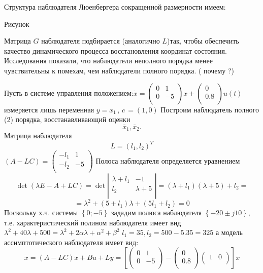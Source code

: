 \documentclass[preprint,russian,a5paper,10pt,twoside,mediummath]{ncc}
\begin{document}
Структура наблюдателя Люенбергера сокращенной размерности имеем:
\par 
\par	Рисунок
\par

Матрица $G$ наблюдателя подбирается (аналогично $L$)так, чтобы обеспечить качество динамического процесса восстановления координат состояния. Исследования показали, что наблюдатели неполного порядка менее чувствительны к помехам, чем наблюдатели полного порядка. ( почему ?)
\\
\par Пусть в системе управления положением:$\dot{x}=\left( \begin{matrix}
   0 & 1  \\
   0 & -5  \\
\end{matrix} \right)x+\left( \begin{matrix}
   0  \\
   0.8  \\
\end{matrix} \right)u(t)$ измеряется лишь переменная $y={{x}_{1}}\,,\,c\,=(1,0)$ Построим наблюдатель полного (2) порядка, восстанавливающий оценки    \[{{\bar{x}}_{1}},{{\bar{x}}_{2}}.\] Матрица наблюдателя \[L={{({{l}_{1}},{{l}_{2}})}^{T}}\] $(A-LC)=\left( \begin{matrix}
   -{{l}_{1}} & 1  \\
   -{{l}_{2}} & -5  \\
\end{matrix} \right)$ Полоса наблюдателя определяется уравнением 
\[\det (\lambda E-A+LC)=\det \left| \begin{matrix}
   \lambda +{{l}_{1}} & -1  \\
   {{l}_{2}} & \lambda +5  \\
\end{matrix} \right|=(\lambda +{{l}_{1}})(\lambda +5)+{{l}_{2}}=\]
\[={{\lambda }^{2}}+(5+{{l}_{1}})\lambda +(5{{l}_{1}}+{{l}_{2}})=0\]
Поскольку х.ч. системы $\left\{ 0;-5 \right\}$  зададим полюса наблюдателя $\left\{ -20\pm j10 \right\}$, т.е. характеристический полином наблюдателя имеет вид ${{\lambda }^{2}}+40\lambda +500={{\lambda }^{2}}+2\alpha \lambda +{{\alpha }^{2}}+{{\beta }^{2}}$
${{l}_{1}}=35,{{l}_{2}}=500-5.35=325$
а модель ассимптотического наблюдателя имеет вид:\[\dot{\bar{x}}=(A-LC)\bar{x}+Bu+Ly=\left[ \left( \begin{matrix}
   0 & 1  \\
   0 & -5  \\
\end{matrix} \right)-\left( \begin{matrix}
   0  \\
   0.8  \\
\end{matrix} \right)\left( \begin{matrix}
   1 & 0  \\
\end{matrix} \right) \right]\bar{x}\] 
\end{document}
